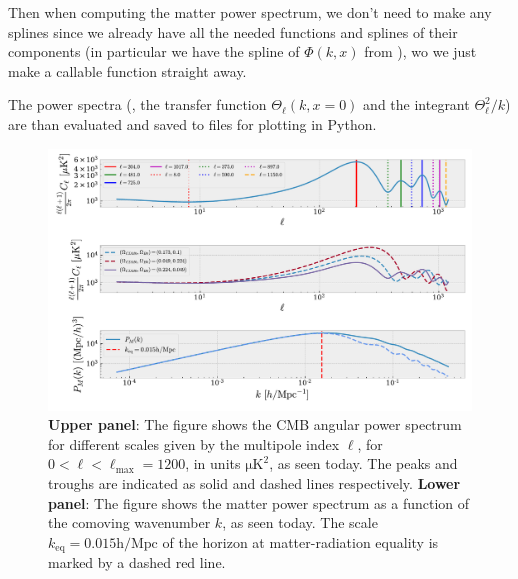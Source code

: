 \documentclass[twocolumn]{aastex62}
\begin{document}
Then when computing the matter power spectrum, we don't need to make any splines since we already have all the needed functions and splines of their components (in particular we have the spline of $\Phi(k, x)$ from \cite{stutzer:2020c}), wo we just make a callable function straight away. 

The power spectra (, the transfer function $\Theta_\ell(k, x = 0)$ and the integrant $\Theta_\ell^2 / k$) are than evaluated and saved to files for plotting in Python.

\begin{figure}
    \includegraphics[scale = 0.65]{Figures/Cell.pdf}
    \caption{\textbf{Upper panel}: The figure shows the CMB angular power spectrum for different scales given by the multipole index $\ell$, for $0 < \ell < \ell_\text{max} = 1200$, in units $\mathrm{\mu K}^2$, as seen today. The peaks and troughs are indicated as solid and dashed lines respectively. \textbf{Lower panel}: The figure shows the matter power spectrum as a function of the comoving wavenumber $k$, as seen today. The scale $k_\text{eq} = 0.015 \mathrm{h / Mpc}$ of the horizon at matter-radiation equality is marked by a dashed red line.} 
    \label{fig:Cell}
\end{figure}
\end{document}
